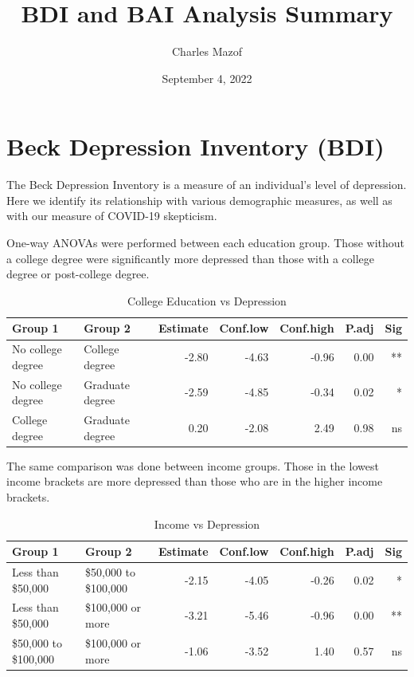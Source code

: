 \documentclass{article}
\title{BDI and BAI Analysis Summary}
\author{Charles Mazof}
\date{September 4, 2022}
\begin{document}
\maketitle

\section*{Beck Depression Inventory (BDI)}

\bigskip
\bigskip

The Beck Depression Inventory is a measure of an individual's level of depression. Here we identify its relationship with various demographic measures, as well as with our measure of COVID-19 skepticism. 

\bigskip
\noindent
One-way ANOVAs were performed between each education group. Those without a college degree were significantly more depressed than those with a college degree or post-college degree.

\begin{table}[ht]
\centering
\caption{College Education vs Depression} \label{tab:title}
\begin{tabular}{llrrrrr}
  \hline
Group 1 & Group 2 & Estimate & Conf.low & Conf.high & P.adj & Sig \\ 
  \hline
No college degree & College degree & -2.80 & -4.63 & -0.96 & 0.00 & ** \\ 
No college degree & Graduate degree & -2.59 & -4.85 & -0.34 & 0.02 & * \\ 
College degree & Graduate degree & 0.20 & -2.08 & 2.49 & 0.98 & ns \\ 
   \hline
\end{tabular}
\end{table}

\bigskip
\bigskip
\noindent
The same comparison was done between income groups. Those in the lowest income brackets are more depressed than those who are in the higher income brackets.

\begin{table}[ht]
\centering
\caption{Income vs Depression} \label{tab:title}
\begin{tabular}{llrrrrr}
  \hline
Group 1 & Group 2 & Estimate & Conf.low & Conf.high & P.adj & Sig \\ 
  \hline
Less than \$50,000 & \$50,000 to \$100,000 & -2.15 & -4.05 & -0.26 & 0.02 & * \\ 
Less than \$50,000 & \$100,000 or more & -3.21 & -5.46 & -0.96 & 0.00 & ** \\ 
\$50,000 to \$100,000 & \$100,000 or more & -1.06 & -3.52 & 1.40 & 0.57 & ns \\ 
   \hline
\end{tabular}
\end{table}
\end{document}

